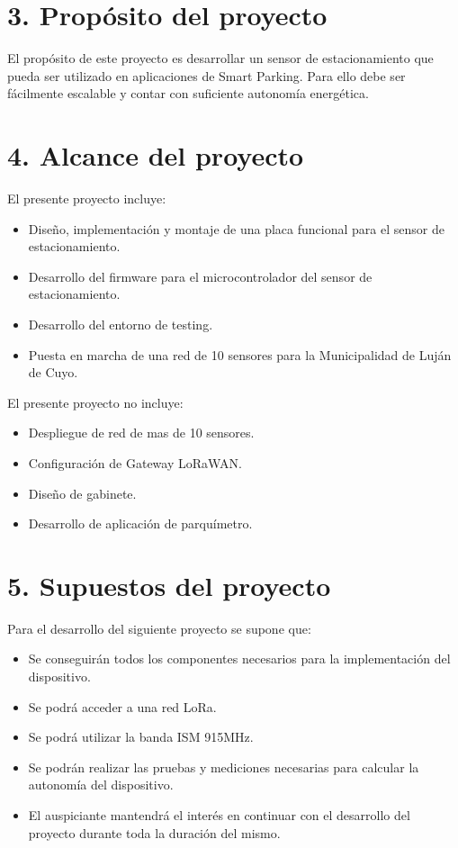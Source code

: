 \documentclass[
11pt, %
]{charter}
\begin{document}
\section{3. Propósito del proyecto}
\label{sec:proposito}

El propósito de este proyecto es desarrollar un sensor de estacionamiento que pueda ser utilizado en aplicaciones de Smart Parking. Para ello debe ser fácilmente escalable y contar con suficiente autonomía energética.


\section{4. Alcance del proyecto}
\label{sec:alcance}

El presente proyecto incluye:
\begin{itemize}
	\item Diseño, implementación y montaje de una placa funcional para el sensor de estacionamiento.
	\item Desarrollo del firmware para el microcontrolador del sensor de estacionamiento.
	\item Desarrollo del entorno de testing.
	\item Puesta en marcha de una red de 10 sensores para la Municipalidad de Luján de Cuyo.
\end{itemize}

El presente proyecto no incluye:
\begin{itemize}
	\item Despliegue de red de mas de 10 sensores.
	\item Configuración de Gateway LoRaWAN.
	\item Diseño de gabinete.
	\item Desarrollo de aplicación de parquímetro.
\end{itemize}

\section{5. Supuestos del proyecto}
\label{sec:supuestos}

Para el desarrollo del siguiente proyecto se supone que:
\begin{itemize}
	\item Se conseguirán todos los componentes necesarios para la implementación del dispositivo.
	\item Se podrá acceder a una red LoRa.
	\item Se podrá utilizar la banda ISM 915MHz.
	\item Se podrán realizar las pruebas y mediciones necesarias para calcular la autonomía del dispositivo.
	\item El auspiciante mantendrá el interés en continuar con el desarrollo del proyecto durante toda la duración del mismo.
\end{itemize}
\end{document}
